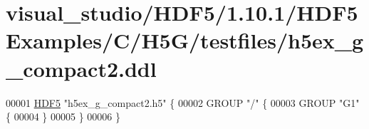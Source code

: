 \hypertarget{visual__studio_2_h_d_f5_21_810_81_2_h_d_f5_examples_2_c_2_h5_g_2testfiles_2h5ex__g__compact2_8ddl_source}{}\section{visual\+\_\+studio/\+H\+D\+F5/1.10.1/\+H\+D\+F5\+Examples/\+C/\+H5\+G/testfiles/h5ex\+\_\+g\+\_\+compact2.ddl}
\label{visual__studio_2_h_d_f5_21_810_81_2_h_d_f5_examples_2_c_2_h5_g_2testfiles_2h5ex__g__compact2_8ddl_source}

\begin{DoxyCode}
00001 \hyperlink{namespace_h_d_f5}{HDF5} \textcolor{stringliteral}{"h5ex\_g\_compact2.h5"} \{
00002 GROUP \textcolor{stringliteral}{"/"} \{
00003    GROUP \textcolor{stringliteral}{"G1"} \{
00004    \}
00005 \}
00006 \}
\end{DoxyCode}

